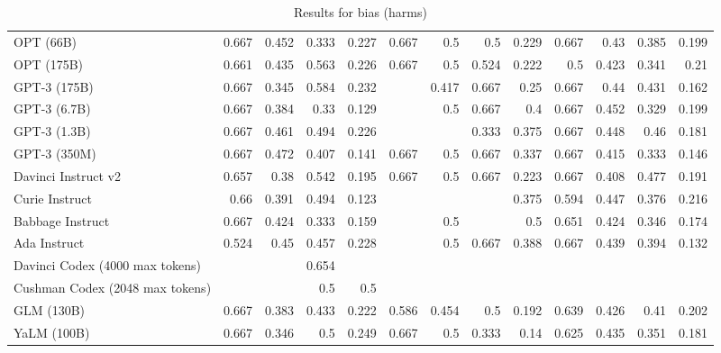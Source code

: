\begin{table}[htp]
{\begin{tabular}{lrrrrrrrrrrrr}
OPT (66B) & 0.667 & 0.452 & 0.333 & 0.227 & 0.667 & 0.5 & 0.5 & 0.229 & 0.667 & 0.43 & 0.385 & 0.199 \\
OPT (175B) & 0.661 & 0.435 & 0.563 & 0.226 & 0.667 & 0.5 & 0.524 & 0.222 & 0.5 & 0.423 & 0.341 & 0.21 \\
GPT-3 (175B) & 0.667 & 0.345 & 0.584 & 0.232 &  & 0.417 & 0.667 & 0.25 & 0.667 & 0.44 & 0.431 & 0.162 \\
GPT-3 (6.7B) & 0.667 & 0.384 & 0.33 & 0.129 &  & 0.5 & 0.667 & 0.4 & 0.667 & 0.452 & 0.329 & 0.199 \\
GPT-3 (1.3B) & 0.667 & 0.461 & 0.494 & 0.226 &  &  & 0.333 & 0.375 & 0.667 & 0.448 & 0.46 & 0.181 \\
GPT-3 (350M) & 0.667 & 0.472 & 0.407 & 0.141 & 0.667 & 0.5 & 0.667 & 0.337 & 0.667 & 0.415 & 0.333 & 0.146 \\
Davinci Instruct v2 & 0.657 & 0.38 & 0.542 & 0.195 & 0.667 & 0.5 & 0.667 & 0.223 & 0.667 & 0.408 & 0.477 & 0.191 \\
Curie Instruct & 0.66 & 0.391 & 0.494 & 0.123 &  &  &  & 0.375 & 0.594 & 0.447 & 0.376 & 0.216 \\
Babbage Instruct & 0.667 & 0.424 & 0.333 & 0.159 &  & 0.5 &  & 0.5 & 0.651 & 0.424 & 0.346 & 0.174 \\
Ada Instruct & 0.524 & 0.45 & 0.457 & 0.228 &  & 0.5 & 0.667 & 0.388 & 0.667 & 0.439 & 0.394 & 0.132 \\
Davinci Codex (4000 max tokens) &  &  & 0.654 &  &  &  &  &  &  &  &  &  \\
Cushman Codex (2048 max tokens) &  &  & 0.5 & 0.5 &  &  &  &  &  &  &  &  \\
GLM (130B) & 0.667 & 0.383 & 0.433 & 0.222 & 0.586 & 0.454 & 0.5 & 0.192 & 0.639 & 0.426 & 0.41 & 0.202 \\
YaLM (100B) & 0.667 & 0.346 & 0.5 & 0.249 & 0.667 & 0.5 & 0.333 & 0.14 & 0.625 & 0.435 & 0.351 & 0.181 \\
\bottomrule
\end{tabular}}
\caption{Results for bias (harms)}
\label{fig:bias (harms)}
\end{table}